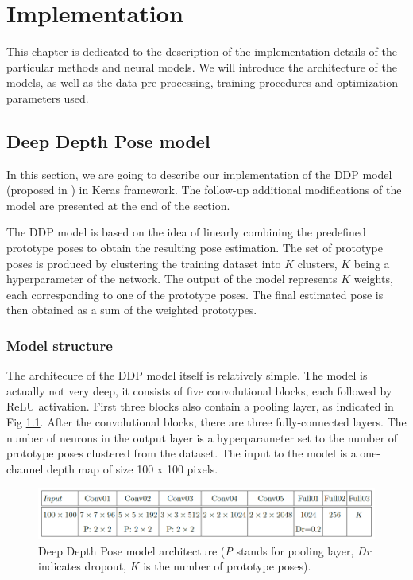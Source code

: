 \chapter{Implementation}\label{chap:implementation}
This chapter is dedicated to the description of the implementation details of the particular methods and neural models. We will introduce the architecture of the models, as well as the data pre-processing, training procedures and optimization parameters used.

\section{Deep Depth Pose model}
In this section, we are going to describe our implementation of the DDP model (proposed in \cite{Marin18jvcir}) in Keras framework. The follow-up additional modifications of the model are presented at the end of the section.\par
\vspace{5mm}
\noindent
The DDP model is based on the idea of linearly combining the predefined prototype poses to obtain the resulting pose estimation. The set of prototype poses is produced by clustering the training dataset into $K$ clusters, $K$ being a hyperparameter of the network. The output of the model represents $K$ weights, each corresponding to one of the prototype poses. The final estimated pose is then obtained as a sum of the weighted prototypes.


\subsection{Model structure}

The architecure of the DDP model itself is relatively simple. The model is actually not very deep, it consists of five convolutional blocks, each followed by ReLU activation. First three blocks also contain a pooling layer, as indicated in Fig \ref{fig:ddp}. After the convolutional blocks, there are three fully-connected layers. The number of neurons in the output layer is a hyperparameter set to the number of prototype poses clustered from the dataset. The input to the model is a one-channel depth map of size 100 x 100 pixels.\par

\vspace{5mm}
\begin{figure}[H]
\begin{center}
  \includegraphics[width=\textwidth]{images/implementation/ddp.PNG}
  \caption[Deep Depth Pose model architecture \cite{Marin18jvcir}.]{Deep Depth Pose model architecture \cite{Marin18jvcir} (\textit{P} stands for pooling layer, \textit{Dr} indicates dropout, $K$ is the number of prototype poses).}
  \label{fig:ddp}
\end{center}
\end{figure}


